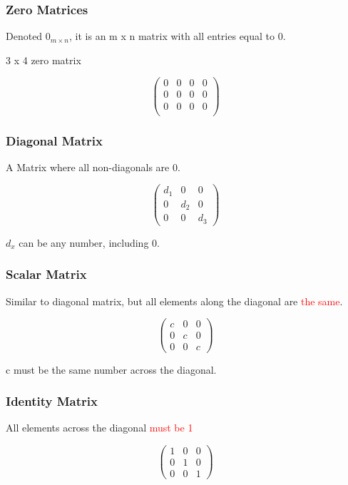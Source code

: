 \documentclass{article}
\begin{document}
\subsubsection{Zero Matrices}
Denoted $0_{m\times n}$, it is an m x n matrix with all entries equal to 0.

\begin{center}
    3 x 4 zero matrix
\end{center}
\[
\left(
\begin{array}{cccc}
    0 & 0 & 0 & 0\\  
    0 & 0 & 0 & 0\\  
    0 & 0 & 0 & 0\\
\end{array}
\right)
\]

\subsubsection{Diagonal Matrix}
A Matrix where all non-diagonals are 0.

\[
\begin{pmatrix}
d_1 & 0 & 0 \\
0 & d_2 & 0 \\
0 & 0 & d_3 
\end{pmatrix}
\]

$d_x$ can be any number, including 0.

\subsubsection{Scalar Matrix}
Similar to diagonal matrix, but all elements along the diagonal are \textcolor{red}{the same}.

\[
\begin{pmatrix}
c & 0 & 0 \\
0 & c & 0 \\
0 & 0 & c 
\end{pmatrix}
\]

c must be the same number across the diagonal.

\subsubsection{Identity Matrix}
All elements across the diagonal \textcolor{red}{must be 1}

\[
\begin{pmatrix}
1 & 0 & 0 \\
0 & 1 & 0 \\
0 & 0 & 1 
\end{pmatrix}
\]
\end{document}
